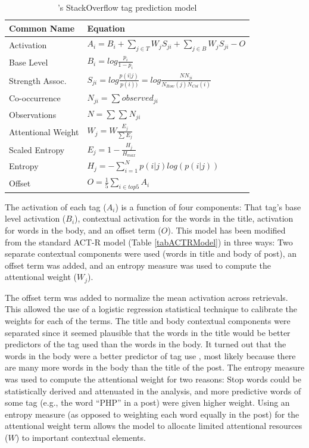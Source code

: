 \documentclass[man,floatsintext,donotrepeattitle]{apa6}
\begin{document}
\begin{table}[!ht]
  \caption{\citeauthor{Stanley2013}'s StackOverflow tag prediction model}
  \label{tabModACTRModel}
  {\tabulinesep=1.2mm
    \begin{tabu}{ll}
      \hline
      Common Name &  Equation \\
      \hline
      Activation & 		$A_{i} = B_{i} + \sum_{j\in T}^{ } W_{j} S_{ji} + \sum_{j\in B}^{ } W_{j} S_{ji} - O$ \\
      Base Level & 		$B_{i} = log \frac{p_{i}}{1-p_{i}}$ \\
      Strength Assoc. &		$S_{ji} = log \frac{p(i|j)}{p(i))} = log \frac{NN_{ji}}{N_{Row}(j)N_{Col}(i)}$ \\
      Co-occurrence &		$N_{ji} = \sum_{}^{}{observed_{ji}}$ \\
      Observations &		$N = \sum_{}^{}{\sum_{}^{}{N_{ji}}}$ \\
      Attentional Weight& 	$W_{j} = W \frac{E_{j}} {\sum_{}^{} {E_{j}}} $ \\
      Scaled Entropy & 		$E_{j} = 1-\frac{H_{j}}{H_{max}}$ \\
      Entropy & 		$H_{j} = -\sum_{i=1}^{N}p(i|j)log\left (  p(i|j) \right )$ \\
      Offset & 			$O = \frac{1}{5}\sum_{i\in top 5}^{ } A_{i}$ \\
      \hline
    \end{tabu}
  }
\end{table}

The activation of each tag ($A_{i}$) is a function of four components:
That tag's base level activation ($B_{i}$), contextual activation for the words in the title, activation for words in the body, and an offset term ($O$).
This model has been modified from the standard ACT-R model (Table \ref{tabACTRModel}) in three ways:
Two separate contextual components were used (words in title and body of post), an offset term was added, and an entropy measure was used to compute the attentional weight ($W_{j}$).

The offset term was added to normalize the mean activation across retrievals.
This allowed the use of a logistic regression statistical technique to calibrate the weights for each of the terms.
The title and body contextual components were separated since it seemed plausible that the words in the title would be better predictors of the tag used than the words in the body.
It turned out that the words in the body were a better predictor of tag use \parencite{Stanley2013}, most likely because there are many more words in the body than the title of the post.
The entropy measure was used to compute the attentional weight for two reasons:
Stop words could be statistically derived and attenuated in the analysis, and more predictive words of some tag (e.g., the word ``PHP'' in a post) were given higher weight.
Using an entropy measure (as opposed to weighting each word equally in the post) for the attentional weight term allows the model to allocate limited attentional resources ($W$) to important contextual elements.
\end{document}
